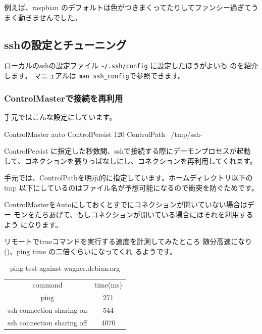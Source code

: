 \documentclass[mingoth,a4paper]{jsarticle}
\begin{document}
例えば、raspbian のデフォルトは色がつきまくってたりしてファンシー過ぎてう
まく動きませんでした。

\subsection{sshの設定とチューニング}

ローカルのsshの設定ファイル \verb!~/.ssh/config! に設定したほうがよいも
のを紹介します。
マニュアルは \verb!man ssh_config!\cite{sshconfig}で参照できます。

\subsubsection{ControlMasterで接続を再利用}

手元ではこんな設定にしています。

\begin{commandline}
 ControlMaster auto
 ControlPersist 120
 ControlPath ~/tmp/ssh-%
\end{commandline}


ControlPersist に指定した秒数間、sshで接続する際にデーモンプロセスが起動
して、コネクションを張りっぱなしにし、コネクションを再利用してくれます。

手元では、ControlPathを明示的に指定しています。ホームディレクトリ以下の
tmp 以下にしているのはファイル名が予想可能になるので衝突を防ぐためです。

ControlMasterをAutoにしておくとすでにコネクションが開いていない場合はデー
モンをたちあげて、もしコネクションが開いている場合にはそれを利用するよう
になります。

リモートでtrueコマンドを実行する速度を計測してみたところ
随分高速になり()、ping time の二倍くらいになってくれ
るようです。

\begin{table}[ht]
\begin{center}
  \begin{tabular}{|c|c|}
   command & time(ms) \\
   ping& 271 \\
   ssh connection sharing on & 544 \\
   ssh connection sharing off & 4070 \\
 \end{tabular}
 \caption{ping test against wagner.debian.org}
 \label{fig:pingwagner}
\end{center}
\end{table}
\end{document}
